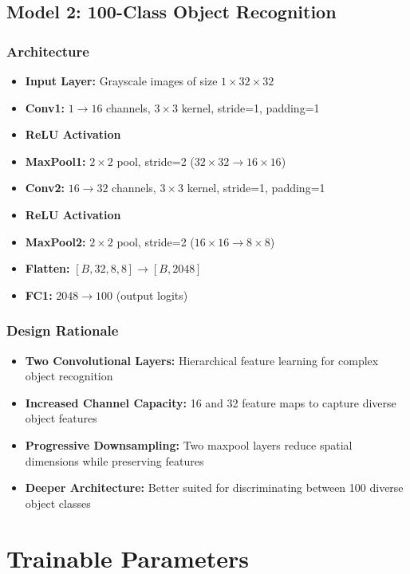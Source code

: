 \documentclass[11pt,a4paper]{article}
\begin{document}
\subsection{Model 2: 100-Class Object Recognition}

\subsubsection{Architecture}
\begin{itemize}
    \item \textbf{Input Layer:} Grayscale images of size $1 \times 32 \times 32$
    \item \textbf{Conv1:} $1 \rightarrow 16$ channels, $3 \times 3$ kernel, stride=1, padding=1
    \item \textbf{ReLU Activation}
    \item \textbf{MaxPool1:} $2 \times 2$ pool, stride=2 ($32 \times 32 \rightarrow 16 \times 16$)
    \item \textbf{Conv2:} $16 \rightarrow 32$ channels, $3 \times 3$ kernel, stride=1, padding=1
    \item \textbf{ReLU Activation}
    \item \textbf{MaxPool2:} $2 \times 2$ pool, stride=2 ($16 \times 16 \rightarrow 8 \times 8$)
    \item \textbf{Flatten:} $[B, 32, 8, 8] \rightarrow [B, 2048]$
    \item \textbf{FC1:} $2048 \rightarrow 100$ (output logits)
\end{itemize}

\subsubsection{Design Rationale}
\begin{itemize}
    \item \textbf{Two Convolutional Layers:} Hierarchical feature learning for complex object recognition
    \item \textbf{Increased Channel Capacity:} 16 and 32 feature maps to capture diverse object features
    \item \textbf{Progressive Downsampling:} Two maxpool layers reduce spatial dimensions while preserving features
    \item \textbf{Deeper Architecture:} Better suited for discriminating between 100 diverse object classes
\end{itemize}

\section{Trainable Parameters}
\end{document}
